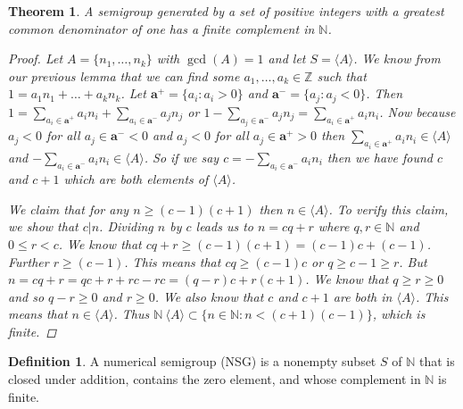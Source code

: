 \documentclass[11pt]{amsart}
\theoremstyle{plain}
\newtheorem{thm}{Theorem}
\theoremstyle{definition}
\newtheorem{defi}{Definition}
\begin{document}
\begin{thm}
A semigroup generated by a set of positive integers with a
greatest common denominator of one has a finite complement in $\mathbb{N}$.
\begin{proof}
Let $A=\{n_1,\dots,n_k\}$ with $\gcd(A)=1$ and let $S=\langle A\rangle$. We
know from our previous lemma that we can find some $a_1,\dots,a_k\in \mathbb{Z}$
such that $1=a_1n_1+\dots+a_kn_k$. Let $\mathbf{a^+}=\{a_i:a_i>0\}$ and
$\mathbf{a^-}=\{a_j:a_j<0\}$. Then $1=\sum\limits_{a_i\in\mathbf{a^+}}{a_in_i}+
\sum\limits_{a_i\in\mathbf{a^-}}{a_jn_j}$ or $1-\sum\limits_{a_j\in\mathbf{a^-}}
{a_jn_j}=\sum\limits_{a_i\in\mathbf{a^+}}{a_in_i}$. Now because $a_j<0$ for all
$a_j\in \mathbf{a^-}<0$ and $a_j<0$ for all $a_j\in \mathbf{a^+}>0$ then $\sum\limits_{a_i\in\mathbf{a^+}}
{a_in_i}\in \langle A\rangle $ and $-\sum\limits_{a_i\in\mathbf{a^-}}{a_in_i}\in
\langle A\rangle $. So if we say $c=-\sum\limits_{a_i\in\mathbf{a^-}}{a_in_i}$
then we have found $c$ and $c+1$ which are both elements of $ \langle A\rangle$.

We claim that for any $n\ge (c-1)(c+1)$ then $n\in \langle A\rangle$. To verify
this claim, we show that $c|n$. Dividing $n$ by $c$ leads us to $n=cq+r$ where
$q,r\in \mathbb{N}$ and $0\le r<c$. We know that $cq+r\ge(c-1)(c+1)=(c-1)c+(c-1)$.
Further $r\ge (c-1)$. This means that $cq\ge (c-1)c$ or $q\ge c-1\ge r$. But
$n=cq+r=qc+r+rc-rc=(q-r)c+r(c+1)$. We know that $q\ge r\ge 0$ and so $q-r\ge 0$
and $r\ge 0$. We also know that $c$ and $c+1$ are both in $ \langle A\rangle$.
This means that $n\in \langle A\rangle$. Thus
$\mathbb{N}\ \langle A\rangle\subset \{n\in \mathbb{N}:n<(c+1)(c-1)\}$, which is
finite.

\end{proof}
\end{thm}
\begin{defi}\cite{rosales}
  A numerical semigroup (NSG) is a nonempty subset $S$ of $\mathbb{N}$ that is closed
under addition, contains the zero element, and whose complement in $\mathbb{N}$
is finite.
\end{defi}
\end{document}
